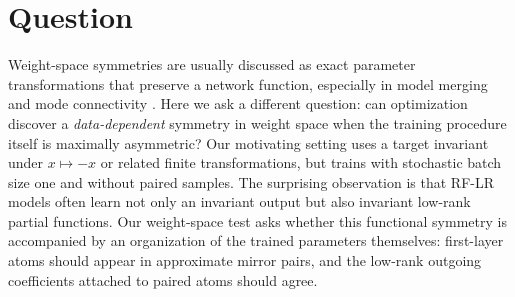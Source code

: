 \documentclass[nohyperref]{article}
\begin{document}
\raggedbottom


\printAffiliationsAndNotice{}

\begin{abstract}
We study an empirical phenomenon in low-rank random-feature networks: even when stochastic training sees one non-symmetrized sample at a time, the learned model can recover a globally symmetric function and, in successful regimes, symmetric internal partial functions.
The effect is not explained by output invariance alone.
Low-loss counterexamples exist where the output is nearly symmetric but the learned partial functions remain asymmetric.
We therefore analyze symmetry simultaneously in function space, representation space, and weight space.
Across one-dimensional sum of cosines experiments and new multidimensional batch-size-one experiments, low-rank bottleneck networks exhibit a distinctive regime where symmetry is visible in late partial functions and in mirror-paired first-layer atoms with matched outgoing weights.
\end{abstract}

\section{Question}

Weight-space symmetries are usually discussed as exact parameter transformations that preserve a network function, especially in model merging and mode connectivity \citep{garipov2018loss,frankle2020linear,entezari2022role,ainsworth2023git}.
Here we ask a different question: can optimization discover a \emph{data-dependent} symmetry in weight space when the training procedure itself is maximally asymmetric?
Our motivating setting uses a target invariant under $x \mapsto -x$ or related finite transformations, but trains with stochastic batch size one and without paired samples.
The surprising observation is that RF-LR models often learn not only an invariant output but also invariant low-rank partial functions.
Our weight-space test asks whether this functional symmetry is accompanied by an organization of the trained parameters themselves: first-layer atoms should appear in approximate mirror pairs, and the low-rank outgoing coefficients attached to paired atoms should agree.
\end{document}
